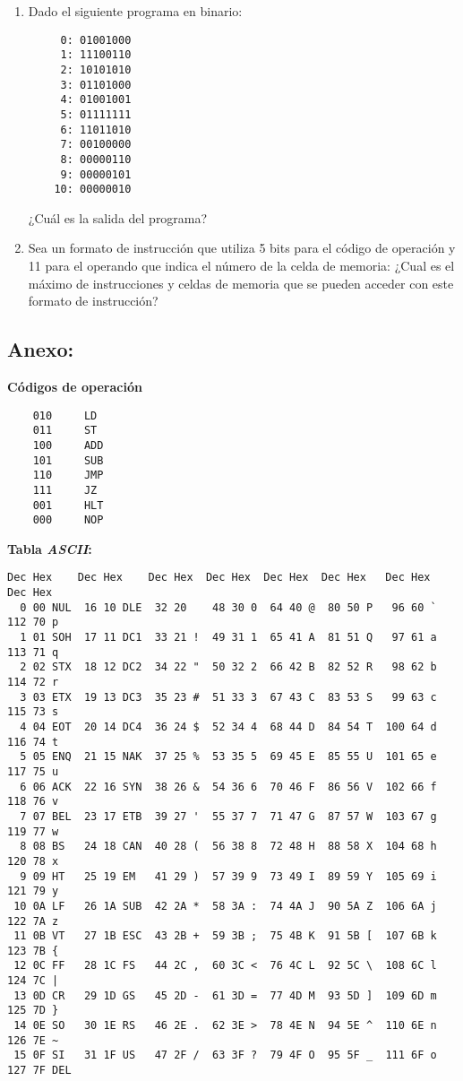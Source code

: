 \documentclass[12pt]{article}
\begin{document}
\begin{enumerate}
\begin{enumerate}
        \end{enumerate}

    \item Dado el siguiente programa en binario:

        \begin{verbatim}
     0: 01001000
     1: 11100110
     2: 10101010
     3: 01101000
     4: 01001001
     5: 01111111
     6: 11011010
     7: 00100000
     8: 00000110
     9: 00000101
    10: 00000010
        \end{verbatim}

        ¿Cuál es la salida del programa?

    \item Sea un formato de instrucción que utiliza 5 bits para el código de
        operación y 11 para el operando que indica el número de la celda de
        memoria: ¿Cual es el máximo de instrucciones y celdas de memoria que
        se pueden acceder con este formato de instrucción?

\end{enumerate}

\subsection*{ \large\textbf{Anexo:} }

\textbf{Códigos de operación}

\begin{verbatim}
    010     LD
    011     ST
    100     ADD
    101     SUB
    110     JMP
    111     JZ
    001     HLT
    000     NOP
\end{verbatim}

\textbf{Tabla \emph{ASCII}:}

\begin{verbatim}
Dec Hex    Dec Hex    Dec Hex  Dec Hex  Dec Hex  Dec Hex   Dec Hex   Dec Hex
  0 00 NUL  16 10 DLE  32 20    48 30 0  64 40 @  80 50 P   96 60 `  112 70 p
  1 01 SOH  17 11 DC1  33 21 !  49 31 1  65 41 A  81 51 Q   97 61 a  113 71 q
  2 02 STX  18 12 DC2  34 22 "  50 32 2  66 42 B  82 52 R   98 62 b  114 72 r
  3 03 ETX  19 13 DC3  35 23 #  51 33 3  67 43 C  83 53 S   99 63 c  115 73 s
  4 04 EOT  20 14 DC4  36 24 $  52 34 4  68 44 D  84 54 T  100 64 d  116 74 t
  5 05 ENQ  21 15 NAK  37 25 %  53 35 5  69 45 E  85 55 U  101 65 e  117 75 u
  6 06 ACK  22 16 SYN  38 26 &  54 36 6  70 46 F  86 56 V  102 66 f  118 76 v
  7 07 BEL  23 17 ETB  39 27 '  55 37 7  71 47 G  87 57 W  103 67 g  119 77 w
  8 08 BS   24 18 CAN  40 28 (  56 38 8  72 48 H  88 58 X  104 68 h  120 78 x
  9 09 HT   25 19 EM   41 29 )  57 39 9  73 49 I  89 59 Y  105 69 i  121 79 y
 10 0A LF   26 1A SUB  42 2A *  58 3A :  74 4A J  90 5A Z  106 6A j  122 7A z
 11 0B VT   27 1B ESC  43 2B +  59 3B ;  75 4B K  91 5B [  107 6B k  123 7B {
 12 0C FF   28 1C FS   44 2C ,  60 3C <  76 4C L  92 5C \  108 6C l  124 7C |
 13 0D CR   29 1D GS   45 2D -  61 3D =  77 4D M  93 5D ]  109 6D m  125 7D }
 14 0E SO   30 1E RS   46 2E .  62 3E >  78 4E N  94 5E ^  110 6E n  126 7E ~
 15 0F SI   31 1F US   47 2F /  63 3F ?  79 4F O  95 5F _  111 6F o  127 7F DEL
\end{verbatim}
\end{document}
